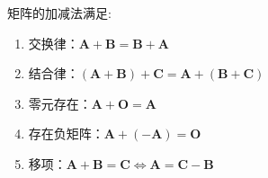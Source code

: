 \begin{formal}
\begin{proposition}[加减法性质]\label{prop:加减法性质}
    矩阵的加减法满足:
\setcounter{equation}{0}
\begin{enumerate}[label=\textup{(\arabic*)}]
    \item 交换律：$\bm{A} + \bm{B} = \bm{B} + \bm{A} $
    \item 结合律：$\left( \bm{A} + \bm{B} \right) + \bm{C} = \bm{A}
    + \left( \bm{B} + \bm{C}\right)$
    \item 零元存在：$\bm{A} + \bm{O} = \bm{A}$
    \item 存在负矩阵：$
    \bm{A}+\left(-\bm{A}\right) = \bm{O}$
    \item 移项：$
    \bm{A} + \bm{B} = \bm{C} \Longleftrightarrow \bm{A}
    = \bm{C} - \bm{B} $
\end{enumerate}
\end{proposition}
\end{formal}
\vfill
